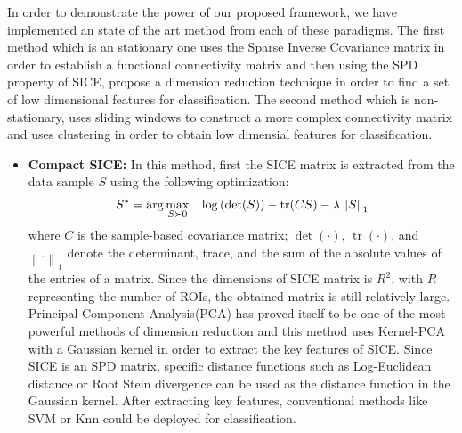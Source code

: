 \documentclass[journal]{IEEEtran}
\newcommand\norm[1]{\left\lVert#1\right\rVert}
\begin{document}
	In order to demonstrate the power of our proposed framework, we have implemented an state of the art method from each of these paradigms. The first method which is an stationary one uses the Sparse Inverse Covariance matrix in order to establish a functional connectivity matrix and then using the SPD property of SICE, propose a dimension reduction technique in order to find a set of low dimensional features for classification. The second method which is non-stationary, uses sliding windows to  construct a more complex connectivity matrix and uses clustering in order to obtain low dimensial features for classification.     


\begin{itemize}
	\item \textbf{Compact SICE:}
	In this method, first the SICE matrix is extracted from the data sample $S$ using the following optimization: 
	\begin{align}
	S^* = \operatorname{arg} \max\limits_{S\succ 0} \hspace{3mm} \log \left( \det(S) \right) - \operatorname{tr}(CS) - \lambda \norm{S}_1
	\end{align}
	where $C$ is the sample-based covariance matrix; $\det(·)$, $\operatorname{tr}(·)$,
	and $\norm{.}_1$ denote the determinant, trace, and the sum of the absolute values of the entries of a matrix. Since the dimensions of SICE matrix is $R^2$, with $R$ representing the number of ROIs, the obtained matrix is still relatively large. Principal Component Analysis(PCA) has proved itself to be one of the most powerful methods of dimension reduction and this method uses Kernel-PCA with a Gaussian kernel in order to extract the key features of SICE.
	Since SICE is an SPD matrix, specific distance functions such as Log-Euclidean distance or Root Stein divergence can be used as the distance function in the Gaussian kernel.
	After extracting key features, conventional methods like SVM or Knn could be deployed for classification.
	

\end{itemize}
\end{document}
